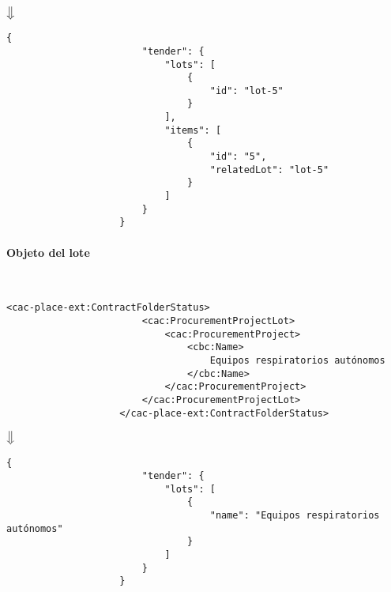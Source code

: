                 \begin{center}
                    $\big\Downarrow$
                \end{center}
                
                \begin{lstlisting}[language=lJSON]
                    {
                        "tender": {
                            "lots": [
                                {
                                    "id": "lot-5"
                                }
                            ],
                            "items": [
                                {
                                    "id": "5",
                                    "relatedLot": "lot-5"
                                }
                            ]
                        }
                    }
                \end{lstlisting}
\newpage
            \paragraph{Objeto del lote} \mbox{}\\
                \begin{lstlisting}[language=lXML]
                    <cac-place-ext:ContractFolderStatus>
                        <cac:ProcurementProjectLot>
                            <cac:ProcurementProject>
                                <cbc:Name>
                                    Equipos respiratorios autónomos
                                </cbc:Name>
                            </cac:ProcurementProject>
                        </cac:ProcurementProjectLot>
                    </cac-place-ext:ContractFolderStatus>
                \end{lstlisting}
                
                \begin{center}
                    $\big\Downarrow$
                \end{center}
                
                \begin{lstlisting}[language=lJSON]
                    {
                        "tender": {
                            "lots": [
                                {
                                    "name": "Equipos respiratorios autónomos"
                                }
                            ]
                        }
                    }
                \end{lstlisting}
                
